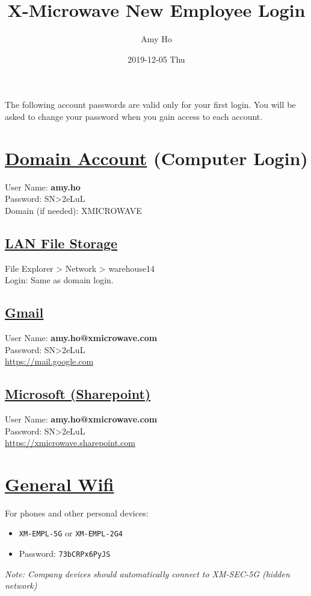 \documentclass[11pt]{article}
\author{Amy Ho}
\date{2019-12-05 Thu}
\title{X-Microwave New Employee Login}
\begin{document}
\maketitle
The following account passwords are valid only for your first login. You will be asked to change your password when you gain access to each account.
\section*{\underline{Domain Account} (Computer Login)}
\label{sec:orgfaa9976}
User Name: \textbf{\MakeLowercase{Amy}.\MakeLowercase{Ho}} \\
Password: SN>2eLuL \\
Domain (if needed): XMICROWAVE

\subsection*{\underline{LAN File Storage}}
\label{sec:org31b3c55}
File Explorer > Network > warehouse14 \\
Login: Same as domain login.

\subsection*{\underline{Gmail}}
\label{sec:orga7e7f62}
User Name: \textbf{\MakeLowercase{Amy}.\MakeLowercase{Ho}@xmicrowave.com} \\
Password: SN>2eLuL \\
\url{https://mail.google.com}

\subsection*{\underline{Microsoft (Sharepoint)}}
\label{sec:org3874613}
User Name: \textbf{\MakeLowercase{Amy}.\MakeLowercase{Ho}@xmicrowave.com} \\
Password: SN>2eLuL \\
\url{https://xmicrowave.sharepoint.com}
\section*{\underline{General Wifi}}
\label{sec:orgd167612}
For phones and other personal devices:
\begin{itemize}
\item \texttt{XM-EMPL-5G} or \texttt{XM-EMPL-2G4}
\item Password: \texttt{73bCRPx6PyJS}
\end{itemize}
\emph{Note: Company devices should automatically connect to XM-SEC-5G (hidden network)}
\end{document}
